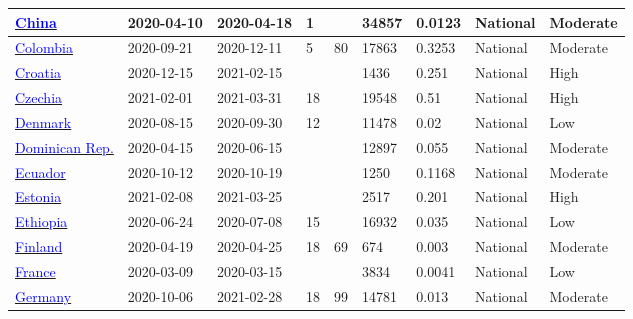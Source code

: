 \begin{table}[ht]
\begin{center}
\begin{tabular}{p{2cm} | p{1.6cm} | p{1.6cm} | p{0.8cm} | p{0.8cm} | p{1cm} | p{1.3cm} | p{1.2cm} | p{1.2cm}}
           \hline 
           \href{https://dx.doi.org/10.1016/j.lanwpc.2021.100094}{\textcolor{blue}{China}} & 2020-04-10 & 2020-04-18 & 1 &  & 34857 & 0.0123 & National & Moderate \\ 
           \hline 
           \href{https://dx.doi.org/10.1016/j.lana.2022.100195}{\textcolor{blue}{Colombia}} & 2020-09-21 & 2020-12-11 & 5 & 80 & 17863 & 0.3253 & National & Moderate \\ 
           \hline 
           \href{https://dx.doi.org/10.3390/pathogens10060774}{\textcolor{blue}{Croatia}} & 2020-12-15 & 2021-02-15 &  &  & 1436 & 0.251 & National & High \\ 
           \hline 
           \href{https://doi.org/10.1038/s43856-022-00080-0}{\textcolor{blue}{Czechia}} & 2021-02-01 & 2021-03-31 & 18 &  & 19548 & 0.51 & National & High \\ 
           \hline 
           \href{https://dx.doi.org/10.1007/s10654-021-00796-8}{\textcolor{blue}{Denmark}} & 2020-08-15 & 2020-09-30 & 12 &  & 11478 & 0.02 & National & Low \\ 
           \hline 
           \href{https://dx.doi.org/10.4269/ajtmh.20-0907}{\textcolor{blue}{Dominican Rep.}} & 2020-04-15 & 2020-06-15 &  &  & 12897 & 0.055 & National & Moderate \\ 
           \hline 
           \href{https://dx.doi.org/10.3389/fmed.2022.933260}{\textcolor{blue}{Ecuador}} & 2020-10-12 & 2020-10-19 &  &  & 1250 & 0.1168 & National & Moderate \\ 
           \hline 
           \href{https://dx.doi.org/10.1080/23744235.2021.1974540}{\textcolor{blue}{Estonia}} & 2021-02-08 & 2021-03-25 &  &  & 2517 & 0.201 & National & High \\ 
           \hline 
           \href{http://dx.doi.org/10.1016/j.ijid.2021.08.028}{\textcolor{blue}{Ethiopia}} & 2020-06-24 & 2020-07-08 & 15 &  & 16932 & 0.035 & National & Low \\ 
           \hline 
           \href{https://www.thl.fi/roko/cov-vaestoserologia/sero\_report\_weekly\_en.html}{\textcolor{blue}{Finland}} & 2020-04-19 & 2020-04-25 & 18 & 69 & 674 & 0.003 & National & Moderate \\ 
           \hline 
           \href{https://dx.doi.org/10.1038/s41467-021-23233-6}{\textcolor{blue}{France}} & 2020-03-09 & 2020-03-15 &  &  & 3834 & 0.0041 & National & Low \\ 
           \hline 
           \href{https://dx.doi.org/10.1038/s41598-022-23821-6}{\textcolor{blue}{Germany}} & 2020-10-06 & 2021-02-28 & 18 & 99 & 14781 & 0.013 & National & Moderate \\ 

\end{tabular}
\end{center}
\end{table}
